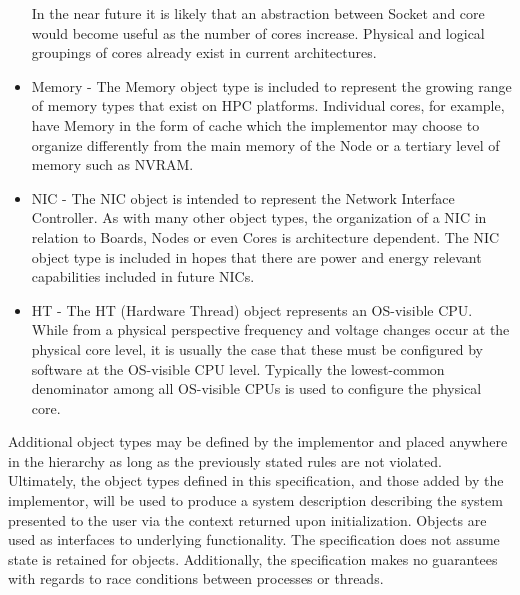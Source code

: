 \begin{itemize}[noitemsep,nolistsep]
{In the near future it is likely that an abstraction between Socket and core would become useful as the number of cores increase. 
Physical and logical groupings of cores already exist in current architectures.
}
	\item{Memory - The Memory object type is included to represent the growing range of memory types that exist on HPC platforms. 
Individual cores, for example, have Memory in the form of cache which the implementor may choose to organize differently from the main memory of the Node or a tertiary level of memory such as NVRAM.
}	
	\item{
NIC - The NIC object is intended to represent the Network Interface Controller.
As with many other object types, the organization of a NIC in relation to Boards, Nodes or even Cores is architecture dependent.
The NIC object type is included in hopes that there are power and energy relevant capabilities included in future NICs.
}	
        \item{
HT - The HT (Hardware Thread) object represents an OS-visible CPU.  
While from a physical perspective frequency and voltage changes occur at the physical core level, it is usually the case that these must be configured by software at the OS-visible CPU level.  
Typically the lowest-common denominator among all OS-visible CPUs is used to configure the physical core.
}

\end{itemize}

Additional object types may be defined by the implementor and placed anywhere in the hierarchy as long as the previously stated rules are not violated.
Ultimately, the  object types defined in this specification, and those added by the implementor, will be used to produce a system description describing the system presented to the user via the context returned upon initialization.
Objects are used as interfaces to underlying functionality.
The specification does not assume state is retained for objects.
Additionally, the specification makes no guarantees with regards to race conditions between processes or threads.

